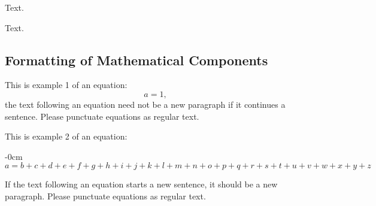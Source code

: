 \documentclass[geosciences,article,submit,moreauthors]{Definitions/mdpi}
\begin{document}

Text.

Text.

\subsection{Formatting of Mathematical Components}

This is example 1 of an equation:
\begin{equation}
a = 1,
\end{equation}
the text following an equation need not be a new paragraph if it continues a sentence. Please punctuate equations as regular text.

This is example 2 of an equation:
\begin{adjustwidth}{-\extralength}{0cm}
\begin{equation}
a = b + c + d + e + f + g + h + i + j + k + l + m + n + o + p + q + r + s + t + u + v + w + x + y + z
\end{equation}
\end{adjustwidth}

If the text following an equation starts a new sentence, it should be a new paragraph. Please punctuate equations as regular text.

\end{document}
